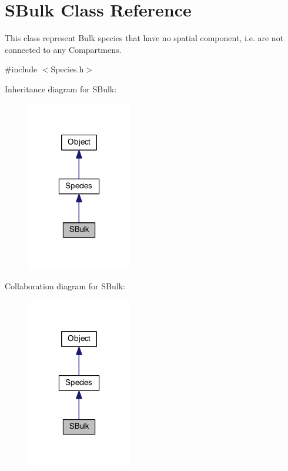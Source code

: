 \hypertarget{classSBulk}{\section{S\-Bulk Class Reference}
\label{classSBulk}
}


This class represent Bulk species that have no spatial component, i.\-e. are not connected to any Compartmens.  




{\ttfamily \#include $<$Species.\-h$>$}



Inheritance diagram for S\-Bulk\-:
\nopagebreak
\begin{figure}[H]
\begin{center}
\leavevmode
\includegraphics[width=130pt]{classSBulk__inherit__graph}
\end{center}
\end{figure}


Collaboration diagram for S\-Bulk\-:
\nopagebreak
\begin{figure}[H]
\begin{center}
\leavevmode
\includegraphics[width=130pt]{classSBulk__coll__graph}
\end{center}
\end{figure}

